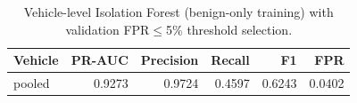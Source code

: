 \begin{table}[t]
\centering
\begin{tabular}{lrrrrr}
\toprule
Vehicle & PR-AUC & Precision & Recall & F1 & FPR \\
\midrule
pooled & 0.9273 & 0.9724 & 0.4597 & 0.6243 & 0.0402 \\
\bottomrule
\end{tabular}
\caption{Vehicle-level Isolation Forest (benign-only training) with validation FPR$\leq$5\% threshold selection.}
\label{tab:vehicle-ids-fpr-controlled}
\end{table}

